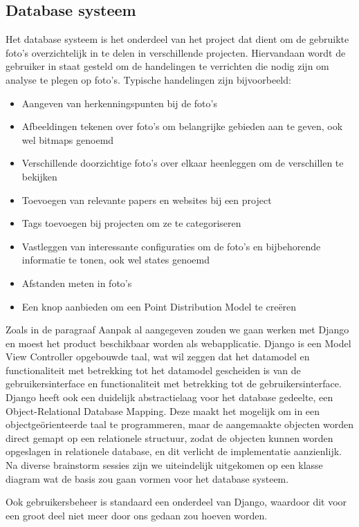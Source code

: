 \subsection{Database systeem}
Het database systeem is het onderdeel van het project dat dient om de gebruikte foto's overzichtelijk in te delen in verschillende projecten. Hiervandaan wordt de gebruiker in staat gesteld om de handelingen te verrichten die nodig zijn om analyse te plegen op foto's. Typische handelingen zijn bijvoorbeeld: 

\begin{itemize}
\item Aangeven van herkenningspunten bij de foto's
\item Afbeeldingen tekenen over foto's om belangrijke gebieden aan te geven, ook wel bitmaps genoemd
\item Verschillende doorzichtige foto's over elkaar heenleggen om de verschillen te bekijken
\item Toevoegen van relevante papers en websites bij een project
\item Tags toevoegen bij projecten om ze te categoriseren
\item Vastleggen van interessante configuraties om de foto's en bijbehorende informatie te tonen, ook wel states genoemd
\item Afstanden meten in foto's
\item Een knop aanbieden om een Point Distribution Model te cre\"{e}ren
\end{itemize}

Zoals in de paragraaf Aanpak al aangegeven zouden we gaan werken met Django en moest het product beschikbaar worden als webapplicatie. Django is een Model View Controller opgebouwde taal, wat wil zeggen dat het datamodel en functionaliteit met betrekking tot het datamodel gescheiden is van de gebruikersinterface en functionaliteit met betrekking tot de gebruikersinterface. Django heeft ook een duidelijk abstractielaag voor het database gedeelte, een Object-Relational Database Mapping. Deze maakt het mogelijk om in een object\-ge\"{o}rienteerde taal te programmeren, maar de aangemaakte objecten worden direct gemapt op een relationele structuur, zodat de objecten kunnen worden opgeslagen in relationele database, en dit verlicht de implementatie aanzienlijk. Na diverse brainstorm sessies zijn we uiteindelijk uitgekomen op een klasse diagram\pageref{Databasediagram} wat de basis zou gaan vormen voor het database systeem.

Ook gebruikers\-beheer is standaard een onderdeel van Django, waardoor dit voor een groot deel niet meer door ons gedaan zou hoeven worden.


